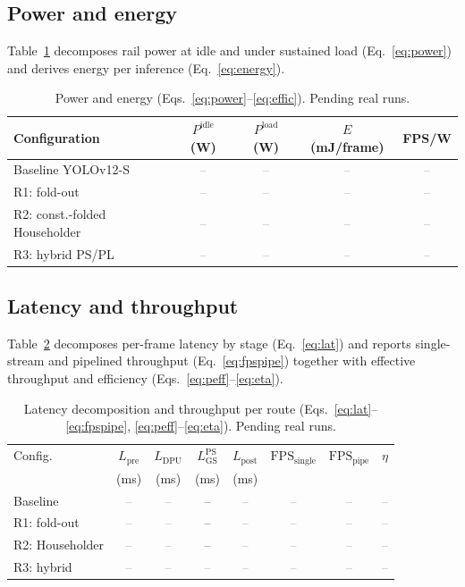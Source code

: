 \documentclass[onecolumn,journal]{IEEEtran}
\newcommand{\tbd}{\textcolor{gray}{--}}
\begin{document}
\subsection{Power and energy}
Table~\ref{tab:power} decomposes rail power at idle and under sustained load
(Eq.~\eqref{eq:power}) and derives energy per inference (Eq.~\eqref{eq:energy}).

\begin{table}[t]
\centering
\caption{Power and energy (Eqs.~\eqref{eq:power}--\eqref{eq:effic}). Pending real
runs.}
\label{tab:power}
\renewcommand{\arraystretch}{1.2}
\begin{tabular}{lcccc}
\toprule
Configuration & $P^{\mathrm{idle}}$ (W) & $P^{\mathrm{load}}$ (W) & $E$ (mJ/frame) & FPS/W\\
\midrule
Baseline YOLOv12-S           & \tbd & \tbd & \tbd & \tbd\\
R1: fold-out                 & \tbd & \tbd & \tbd & \tbd\\
R2: const.-folded Householder& \tbd & \tbd & \tbd & \tbd\\
R3: hybrid PS/PL             & \tbd & \tbd & \tbd & \tbd\\
\bottomrule
\end{tabular}
\end{table}

\subsection{Latency and throughput}
Table~\ref{tab:latency} decomposes per-frame latency by stage (Eq.~\eqref{eq:lat}) and
reports single-stream and pipelined throughput (Eq.~\eqref{eq:fpspipe}) together with
effective throughput and efficiency (Eqs.~\eqref{eq:peff}--\eqref{eq:eta}).

\begin{table}[t]
\centering
\caption{Latency decomposition and throughput per route
(Eqs.~\eqref{eq:lat}--\eqref{eq:fpspipe}, \eqref{eq:peff}--\eqref{eq:eta}). Pending
real runs.}
\label{tab:latency}
\setlength{\tabcolsep}{4pt}
\renewcommand{\arraystretch}{1.2}
\begin{tabular}{lccccccc}
\toprule
Config. & $L_{\mathrm{pre}}$ & $L_{\mathrm{DPU}}$ & $L_{\mathrm{GS}}^{\mathrm{PS}}$ &
$L_{\mathrm{post}}$ & $\mathrm{FPS}_{\mathrm{single}}$ & $\mathrm{FPS}_{\mathrm{pipe}}$ & $\eta$\\
 & (ms) & (ms) & (ms) & (ms) & & & \\
\midrule
Baseline        & \tbd & \tbd & --   & \tbd & \tbd & \tbd & \tbd\\
R1: fold-out    & \tbd & \tbd & --   & \tbd & \tbd & \tbd & \tbd\\
R2: Householder & \tbd & \tbd & --   & \tbd & \tbd & \tbd & \tbd\\
R3: hybrid      & \tbd & \tbd & \tbd & \tbd & \tbd & \tbd & \tbd\\
\bottomrule
\end{tabular}
\end{table}
\end{document}
